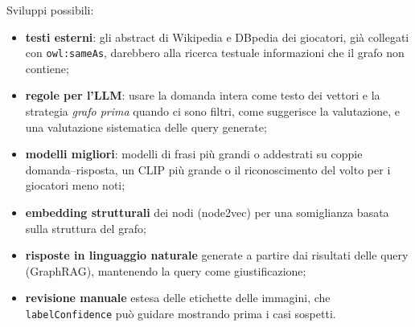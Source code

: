 \documentclass[11pt,a4paper]{article}
\newcommand{\code}[1]{\texttt{\small #1}}
\begin{document}
Sviluppi possibili:
\begin{itemize}
  \item \textbf{testi esterni}: gli abstract di Wikipedia e DBpedia dei giocatori, già collegati con \code{owl:sameAs}, darebbero alla ricerca testuale informazioni che il grafo non contiene;
  \item \textbf{regole per l'LLM}: usare la domanda intera come testo dei vettori e la strategia \emph{grafo prima} quando ci sono filtri, come suggerisce la valutazione, e una valutazione sistematica delle query generate;
  \item \textbf{modelli migliori}: modelli di frasi più grandi o addestrati su coppie domanda--risposta, un CLIP più grande o il riconoscimento del volto per i giocatori meno noti;
  \item \textbf{embedding strutturali} dei nodi (node2vec) per una somiglianza basata sulla struttura del grafo;
  \item \textbf{risposte in linguaggio naturale} generate a partire dai risultati delle query (GraphRAG), mantenendo la query come giustificazione;
  \item \textbf{revisione manuale} estesa delle etichette delle immagini, che \code{labelConfidence} può guidare mostrando prima i casi sospetti.
\end{itemize}

\end{document}

